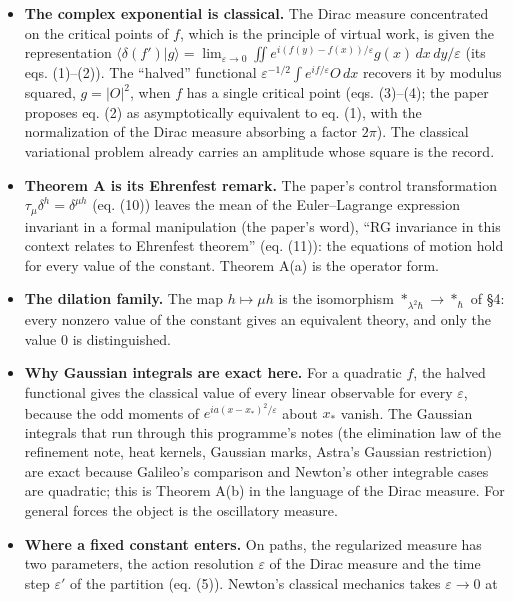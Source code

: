 \documentclass[11pt,a4paper]{article}
\newcommand{\tightlist}{\setlength{\itemsep}{0pt}\setlength{\parskip}{0pt}}
\begin{document}
\begin{itemize}
\tightlist
\item
  \textbf{The complex exponential is classical.} The Dirac measure
  concentrated on the critical points of \(f\), which is the principle
  of virtual work, is given the representation
  \(\langle\delta(f')|g\rangle=\lim_{\varepsilon\to0}\iint e^{i(f(y)-f(x))/\varepsilon}g(x)\,dx\,dy/\varepsilon\)
  (its eqs. (1)--(2)). The ``halved'' functional
  \(\varepsilon^{-1/2}\int e^{if/\varepsilon}O\,dx\) recovers it by
  modulus squared, \(g=|O|^2\), when \(f\) has a single critical point
  (eqs. (3)--(4); the paper proposes eq. (2) as asymptotically
  equivalent to eq. (1), with the normalization of the Dirac measure
  absorbing a factor \(2\pi\)). The classical variational problem
  already carries an amplitude whose square is the record.
\item
  \textbf{Theorem A is its Ehrenfest remark.} The paper's control
  transformation \(\tau_\mu\delta^h=\delta^{\mu h}\) (eq. (10)) leaves
  the mean of the Euler--Lagrange expression invariant in a formal
  manipulation (the paper's word), ``RG invariance in this context
  relates to Ehrenfest theorem'' (eq. (11)): the equations of motion
  hold for every value of the constant. Theorem A(a) is the operator
  form.
\item
  \textbf{The dilation family.} The map \(h\mapsto\mu h\) is the
  isomorphism \(*_{\lambda^2\hbar}\to*_\hbar\) of §4: every nonzero
  value of the constant gives an equivalent theory, and only the value
  \(0\) is distinguished.
\item
  \textbf{Why Gaussian integrals are exact here.} For a quadratic \(f\),
  the halved functional gives the classical value of every linear
  observable for every \(\varepsilon\), because the odd moments of
  \(e^{ia(x-x_*)^2/\varepsilon}\) about \(x_*\) vanish. The Gaussian
  integrals that run through this programme's notes (the elimination law
  of the refinement note, heat kernels, Gaussian marks, Astra's Gaussian
  restriction) are exact because Galileo's comparison and Newton's other
  integrable cases are quadratic; this is Theorem A(b) in the language
  of the Dirac measure. For general forces the object is the oscillatory
  measure.
\item
  \textbf{Where a fixed constant enters.} On paths, the regularized
  measure has two parameters, the action resolution \(\varepsilon\) of
  the Dirac measure and the time step \(\varepsilon'\) of the partition
  (eq. (5)). Newton's classical mechanics takes \(\varepsilon\to0\) at

\end{itemize}
\end{document}

